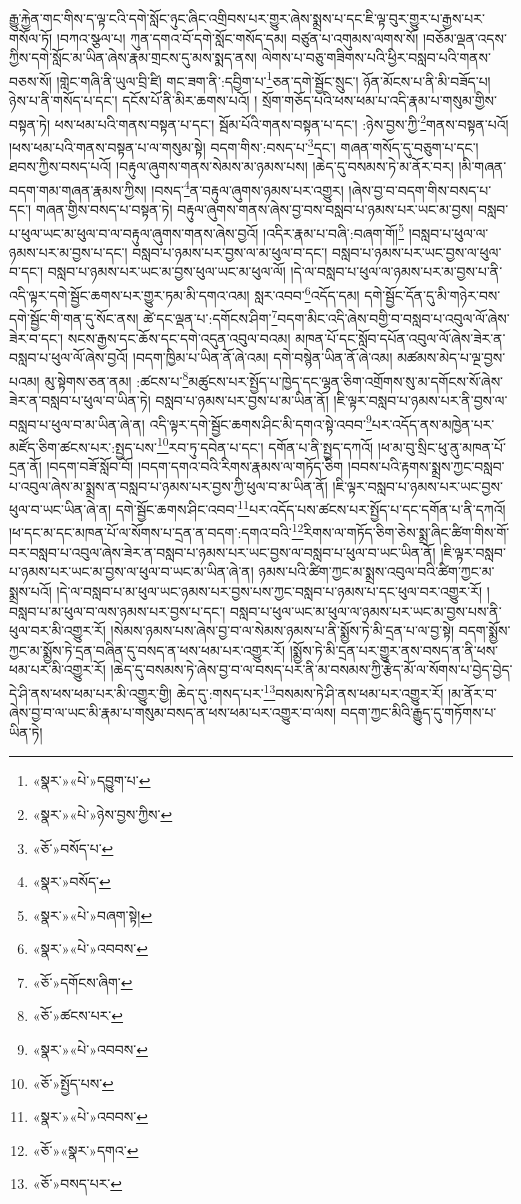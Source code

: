 རྒྱུ་རྐྱེན་གང་གིས་ད་ལྟ་ངའི་དགེ་སློང་ཉུང་ཞིང་འགྲིབས་པར་གྱུར་ཞེས་སྨྲས་པ་དང་ཇི་ལྟ་བུར་གྱུར་པ་རྒྱས་པར་གསོལ་ཏོ། །བཀའ་སྩལ་པ། ཀུན་དགའ་བོ་དགེ་སློང་གསོད་དམ། བཙུན་པ་འགུམས་ལགས་སོ། །བཅོམ་ལྡན་འདས་ཀྱིས་དགེ་སློང་མ་ཡིན་ཞེས་རྣམ་གྲངས་དུ་མས་སྨད་ནས། ལེགས་པ་བཅུ་གཟིགས་པའི་ཕྱིར་བསླབ་པའི་གནས་བཅས་སོ། །གླེང་གཞི་ནི་ཡུལ་བྲི་ཛི། གང་ཟག་ནི་:དབྱིག་པ་\footnote{«སྣར་»«པེ་»དབྱུག་པ་}ཅན་དགེ་སྦྱོང་སྲུང་། ཉོན་མོངས་པ་ནི་མི་བཟོད་པ། ཉེས་པ་ནི་གསོད་པ་དང་། དངོས་པོ་ནི་མིར་ཆགས་པའོ། །
སྲོག་གཅོད་པའི་ཕས་ཕམ་པ་འདི་རྣམ་པ་གསུམ་གྱིས་བསྟན་ཏེ། ཕས་ཕམ་པའི་གནས་བསྟན་པ་དང་། སྦོམ་པོའི་གནས་བསྟན་པ་དང་། :ཉེས་བྱས་ཀྱི་\footnote{«སྣར་»«པེ་»ཉེས་བྱས་ཀྱིས་}གནས་བསྟན་པའོ། །ཕས་ཕམ་པའི་གནས་བསྟན་པ་ལ་གསུམ་སྟེ། བདག་གིས་:བསད་པ་\footnote{«ཅོ་»བསོད་པ་}དང་། གཞན་གསོད་དུ་བཅུག་པ་དང་། ཐབས་ཀྱིས་བསད་པའོ། །བརྟུལ་ཞུགས་གནས་སེམས་མ་ཉམས་པས། །ཆེད་དུ་བསམས་ཏེ་མ་ནོར་བར། །མི་གཞན་བདག་གམ་གཞན་རྣམས་ཀྱིས། །བསད་\footnote{«སྣར་»བསོད་}ན་བརྟུལ་ཞུགས་ཉམས་པར་འགྱུར། །ཞེས་བྱ་བ་བདག་གིས་བསད་པ་དང་། གཞན་གྱིས་བསད་པ་བསྟན་ཏེ། བརྟུལ་ཞུགས་གནས་ཞེས་བྱ་བས་བསླབ་པ་ཉམས་པར་ཡང་མ་བྱས། བསླབ་པ་ཕུལ་ཡང་མ་ཕུལ་བ་ལ་བརྟུལ་ཞུགས་གནས་ཞེས་བྱའོ། །འདིར་རྣམ་པ་བཞི་:བཞག་གོ།\footnote{«སྣར་»«པེ་»བཞག་སྟེ།} །བསླབ་པ་ཕུལ་ལ་ཉམས་པར་མ་བྱས་པ་དང་། བསླབ་པ་ཉམས་པར་བྱས་ལ་མ་ཕུལ་བ་དང་། བསླབ་པ་ཉམས་པར་ཡང་བྱས་ལ་ཕུལ་བ་དང་། བསླབ་པ་ཉམས་པར་ཡང་མ་བྱས་ཕུལ་ཡང་མ་ཕུལ་ལོ། །དེ་ལ་བསླབ་པ་ཕུལ་ལ་ཉམས་པར་མ་བྱས་པ་ནི་འདི་ལྟར་དགེ་སྦྱོང་ཆགས་པར་གྱུར་ཏམ་མི་དགའ་འམ། སླར་འབབ་\footnote{«སྣར་»«པེ་»འབབས་}འདོད་དམ། དགེ་སྦྱོང་དོན་དུ་མི་གཉེར་བས་དགེ་སྦྱོང་གི་གན་དུ་སོང་ནས། ཚེ་དང་ལྡན་པ་:དགོངས་ཤིག་\footnote{«ཅོ་»དགོངས་ཞིག་}བདག་མིང་འདི་ཞེས་བགྱི་བ་བསླབ་པ་འབུལ་ལོ་ཞེས་ཟེར་བ་དང་། སངས་རྒྱས་དང་ཆོས་དང་དགེ་འདུན་འབུལ་བའམ། མཁན་པོ་དང་སློབ་དཔོན་འབུལ་ལོ་ཞེས་ཟེར་ན་བསླབ་པ་ཕུལ་ལོ་ཞེས་བྱའོ། །བདག་ཁྱིམ་པ་ཡིན་ནོ་ཞེ་འམ། དགེ་བསྙེན་ཡིན་ནོ་ཞེ་འམ། མཚམས་མེད་པ་ལྔ་བྱས་པའམ། མུ་སྟེགས་ཅན་ནམ། :ཚངས་པ་\footnote{«ཅོ་»ཚངས་པར་}མཚུངས་པར་སྤྱོད་པ་ཁྱེད་དང་ལྷན་ཅིག་འགྲོགས་སུ་མ་དགོངས་སོ་ཞེས་ཟེར་ན་བསླབ་པ་ཕུལ་བ་ཡིན་ཏེ། བསླབ་པ་ཉམས་པར་བྱས་པ་མ་ཡིན་ནོ། །ཇི་ལྟར་བསླབ་པ་ཉམས་པར་ནི་བྱས་ལ་བསླབ་པ་ཕུལ་བ་མ་ཡིན་ཞེ་ན། འདི་ལྟར་དགེ་སྦྱོང་ཆགས་ཤིང་མི་དགའ་སྟེ་འབབ་\footnote{«སྣར་»«པེ་»འབབས་}པར་འདོད་ནས་མཁྱེན་པར་མཛོད་ཅིག་ཚངས་པར་:སྤྱད་པས་\footnote{«ཅོ་»སྤྱོད་པས་}རབ་ཏུ་དབེན་པ་དང་། དགོན་པ་ནི་སྤྱད་དཀའོ། །ཕ་མ་བུ་སྲིང་ཕུ་ནུ་མཁན་པོ་དྲན་ནོ། །བདག་བཟོ་སློབ་བོ། །བདག་དགའ་བའི་རིགས་རྣམས་ལ་གཏོད་ཅིག །བབས་པའི་རྟགས་སྨྲས་ཀྱང་བསླབ་པ་འབུལ་ཞེས་མ་སྨྲས་ན་བསླབ་པ་ཉམས་པར་བྱས་ཀྱི་ཕུལ་བ་མ་ཡིན་ནོ། །ཇི་ལྟར་བསླབ་པ་ཉམས་པར་ཡང་བྱས་ཕུལ་བ་ཡང་ཡིན་ཞེ་ན། དགེ་སྦྱོང་ཆགས་ཤིང་འབབ་\footnote{«སྣར་»«པེ་»འབབས་}པར་འདོད་པས་ཚངས་པར་སྤྱོད་པ་དང་དགོན་པ་ནི་དཀའོ། །ཕ་དང་མ་དང་མཁན་པོ་ལ་སོགས་པ་དྲན་ན་བདག་:དགའ་བའི་\footnote{«ཅོ་»«སྣར་»དགའ་}རིགས་ལ་གཏོད་ཅིག་ཅེས་སྨྲ་ཞིང་ཚིག་གིས་གོ་བར་བསླབ་པ་འབུལ་ཞེས་ཟེར་ན་བསླབ་པ་ཉམས་པར་ཡང་བྱས་ལ་བསླབ་པ་ཕུལ་བ་ཡང་ཡིན་ནོ། །ཇི་ལྟར་བསླབ་པ་ཉམས་པར་ཡང་མ་བྱས་ལ་ཕུལ་བ་ཡང་མ་ཡིན་ཞེ་ན། ཉམས་པའི་ཚིག་ཀྱང་མ་སྨྲས་འབུལ་བའི་ཚིག་ཀྱང་མ་སྨྲས་པའོ། །དེ་ལ་བསླབ་པ་མ་ཕུལ་ཡང་ཉམས་པར་བྱས་པས་ཀྱང་བསླབ་པ་ཉམས་པ་དང་ཕུལ་བར་འགྱུར་རོ། །བསླབ་པ་མ་ཕུལ་བ་ལས་ཉམས་པར་བྱས་པ་དང་། བསླབ་པ་ཕུལ་ཡང་མ་ཕུལ་ལ་ཉམས་པར་ཡང་མ་བྱས་པས་ནི་ཕུལ་བར་མི་འགྱུར་རོ། །སེམས་ཉམས་པས་ཞེས་བྱ་བ་ལ་སེམས་ཉམས་པ་ནི་སྨྱོས་ཏེ་མི་དྲན་པ་ལ་བྱ་སྟེ། བདག་སྨྱོས་ཀྱང་མ་སྨྱོས་ཏེ་དྲན་བཞིན་དུ་བསད་ན་ཕས་ཕམ་པར་འགྱུར་རོ། །སྨྱོས་ཏེ་མི་དྲན་པར་གྱུར་ནས་བསད་ན་ནི་ཕས་ཕམ་པར་མི་འགྱུར་རོ། །ཆེད་དུ་བསམས་ཏེ་ཞེས་བྱ་བ་ལ་བསད་པར་ནི་མ་བསམས་ཀྱི་རྩེད་མོ་ལ་སོགས་པ་བྱེད་བྱེད་དེ་ཤི་ནས་ཕས་ཕམ་པར་མི་འགྱུར་གྱི། ཆེད་དུ་:གསད་པར་\footnote{«ཅོ་»བསད་པར་}བསམས་ཏེ་ཤི་ནས་ཕམ་པར་འགྱུར་རོ། །མ་ནོར་བ་ཞེས་བྱ་བ་ལ་ཡང་མི་རྣམ་པ་གསུམ་བསད་ན་ཕས་ཕམ་པར་འགྱུར་བ་ལས། བདག་ཀྱང་མིའི་རྒྱུད་དུ་གཏོགས་པ་ཡིན་ཏེ། 